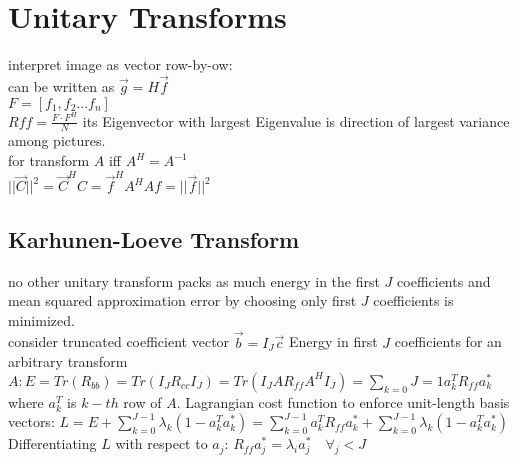 \section{Unitary Transforms}
 interpret image as vector row-by-ow: \\
 can be written as $\vec{g} = H\vec{f}$\\
 $F = [f_1, f_2... f_n]$\\
 $Rff = \frac{F \cdot F^H}{N}$ its Eigenvector with largest Eigenvalue is direction of largest variance among pictures.\\
 for transform $A$ iff $A^H = A^{-1}$ \\
 $||\vec{C}||^{2} = \vec{C}^{H}C = \vec{f}^{H}A^{H}Af = ||\vec{f}||^{2}$ 

\subsection*{Karhunen-Loeve Transform }
 no other unitary transform packs as much energy in the first $J$ coefficients  and mean squared approximation error by choosing only first $J$ coefficients is minimized.\\
 consider truncated coefficient vector $\vec{b} = I_J \vec{c}$  Energy in first $J$ coefficients for an arbitrary transform $A : E = Tr(R_{bb}) = Tr(I_J R_{cc} I_{J}) = Tr(I_J A R_{ff} A^H I_J) = \sum_{k = 0}{J = 1} a_k^T R_{ff} a_k^*$ where $a_k^T$ is $k-th$ row of $A$. Lagrangian cost function to enforce unit-length basis vectors: 
$L = E + \sum_{k = 0}^{J - 1} \lambda_k (1 - a_k^T a_k^*) = \sum_{k = 0}^{J - 1} a_k^T R_{ff} a_k^* + \sum_{k = 0}^{J - 1} \lambda_k (1 - a_k^T a_k^*)$\\ 
Differentiating $L$ with respect to $a_j$: $R_{ff} a_j^* = \lambda_i a_j^* \quad \forall_j < J$ 
